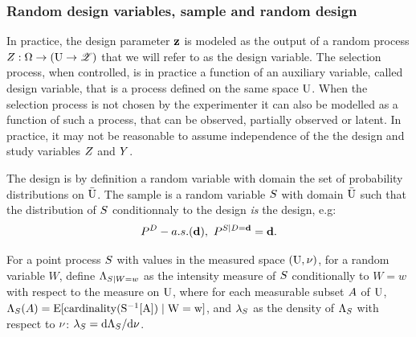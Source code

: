 \subsubsection{Random design variables, sample and random design}
In practice, the design parameter $\mathbf{z}$ is modeled as the output of a random process $Z:\Omega\to(\mathrm{U}\to \mathscr{Z})$ that we will refer to as the design variable.
The selection process, when controlled, is in practice a function of an auxiliary variable, called design variable, that is a process defined on the same space $\mathrm{U}$. When the selection process is not chosen by the experimenter it can also be modelled as a function of such a process, that can be observed, partially observed or latent. In practice, it may not be reasonable to assume independence of the the design and study variables $Z$ and $Y$.


The design is by definition a random variable with domain the set of probability distributions on  $\bar{\mathrm{U}}$. The sample is a random variable $S$ with domain $\bar{\mathrm{U}}$ such that the distribution of $S$ conditionnaly to the design \emph{is} the design, e.g:
$$P^D-a.s.(\mathbf{d}),~P^{S\mid D=\mathbf{d}}=\mathbf{d}.$$

For a point process $S$ with values in the measured space $(\mathrm{U},\nu)$, for a random variable $W$, define $\Lambda_{S\mid W=w}$ as the intensity measure of $S$ conditionally to $W=w$ with respect to the measure on $\mathrm{U}$, where for each measurable subset $A$ of $\mathrm{U}$, $\Lambda_S(A)=\mathrm{E[\mathrm{cardinality}(S^{-1}[A])\mid W=w]}$, and $\lambda_S$ as the density of $\Lambda_S$ with respect to $\nu$: $\lambda_S=\mathrm{d}\Lambda_S/\mathrm{d}\nu$.

%




